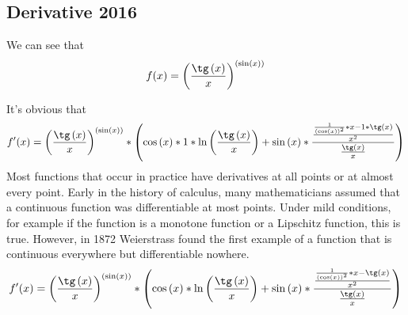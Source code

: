 \documentclass[12pt]{book}
\begin{document}
\begin{center}
 \section*{\huge Derivative 2016 } 
\end{center}

We can see that
\[
f(x) = {\left( \frac{\tg \left( x \right) }{x }\right) }^{\left( \sin \left( x \right) \right) }
\]
	
It's obvious that
\[
f'(x) = {\left( \frac{\tg \left( x \right) }{x }\right) }^{\left( \sin \left( x \right) \right) }* \left( \cos \left( x \right) * 1 * \ln \left( \frac{\tg \left( x \right) }{x }\right) + \sin \left( x \right) * \frac{\frac{\frac{1 }{\left( \cos \left( x \right) \right) ^2 }* x - 1 * \tg \left( x \right) }{x ^2 }}{\frac{\tg \left( x \right) }{x }}\right) 
\]
Most functions that occur in practice have derivatives at all points or at almost every point. Early in the history of calculus, many mathematicians assumed that a continuous function was differentiable at most points. Under mild conditions, for example if the function is a monotone function or a Lipschitz function, this is true. 
However, in 1872 Weierstrass found the first example of a function that is continuous everywhere but differentiable nowhere.
\[
f'(x) = {\left( \frac{\tg \left( x \right) }{x }\right) }^{\left( \sin \left( x \right) \right) }* \left( \cos \left( x \right) * \ln \left( \frac{\tg \left( x \right) }{x }\right) + \sin \left( x \right) * \frac{\frac{\frac{1 }{\left( \cos \left( x \right) \right) ^2 }* x - \tg \left( x \right) }{x ^2 }}{\frac{\tg \left( x \right) }{x }}\right) 
\]
\end{document}
